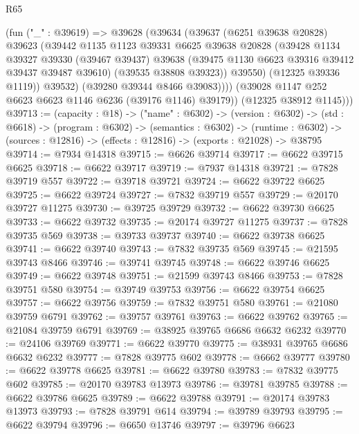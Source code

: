 \begin{lexlean}{R65}
\begin{coremodule}
{              (fun ("_" : @39619) =>
              @39628
                (@39634
                  (@39637
                    (@6251 @39638 @20828)
                    @39623
                    (@39442
                      @1135
                      @1123
                      @39331
                      @6625
                      @39638
                      @20828
                      (@39428
                        @1134
                        @39327
                        @39330
                        (@39467 @39437)
                        @39638
                        (@39475 @1130 @6623 @39316 @39412 @39437 @39487 @39610)
                        (@39535 @38808 @39323))
                      @39550)
                    (@12325 @39336 @1119))
                  @39532)
                (@39280 @39344 @8466 @39083))))
          (@39028 @1147 @252 @6623 @6623 @1146 @6236 (@39176 @1146) @39179))
        (@12325 @38912 @1145)))
@39713 := (capacity : @18) ->
  ("name" : @6302) ->
  (version : @6302) ->
  (std : @6618) ->
  (program : @6302) ->
  (semantics : @6302) ->
  (runtime : @6302) -> (sources : @12816) -> (effects : @12816) -> (exports : @21028) -> @38795
@39714 := @7934 @14318
@39715 := @6626 @39714
@39717 := @6622 @39715 @6625
@39718 := @6622 @39717
@39719 := @7937 @14318
@39721 := @7828 @39719 @557
@39722 := @39718 @39721
@39724 := @6622 @39722 @6625
@39725 := @6622 @39724
@39727 := @7832 @39719 @557
@39729 := @20170 @39727 @11275
@39730 := @39725 @39729
@39732 := @6622 @39730 @6625
@39733 := @6622 @39732
@39735 := @20174 @39727 @11275
@39737 := @7828 @39735 @569
@39738 := @39733 @39737
@39740 := @6622 @39738 @6625
@39741 := @6622 @39740
@39743 := @7832 @39735 @569
@39745 := @21595 @39743 @8466
@39746 := @39741 @39745
@39748 := @6622 @39746 @6625
@39749 := @6622 @39748
@39751 := @21599 @39743 @8466
@39753 := @7828 @39751 @580
@39754 := @39749 @39753
@39756 := @6622 @39754 @6625
@39757 := @6622 @39756
@39759 := @7832 @39751 @580
@39761 := @21080 @39759 @6791
@39762 := @39757 @39761
@39763 := @6622 @39762
@39765 := @21084 @39759 @6791
@39769 := @38925 @39765 @6686 @6632 @6232
@39770 := @24106 @39769
@39771 := @6622 @39770
@39775 := @38931 @39765 @6686 @6632 @6232
@39777 := @7828 @39775 @602
@39778 := @6662 @39777
@39780 := @6622 @39778 @6625
@39781 := @6622 @39780
@39783 := @7832 @39775 @602
@39785 := @20170 @39783 @13973
@39786 := @39781 @39785
@39788 := @6622 @39786 @6625
@39789 := @6622 @39788
@39791 := @20174 @39783 @13973
@39793 := @7828 @39791 @614
@39794 := @39789 @39793
@39795 := @6622 @39794
@39796 := @6650 @13746
@39797 := @39796 @6623
}
\end{coremodule}
\end{lexlean}
